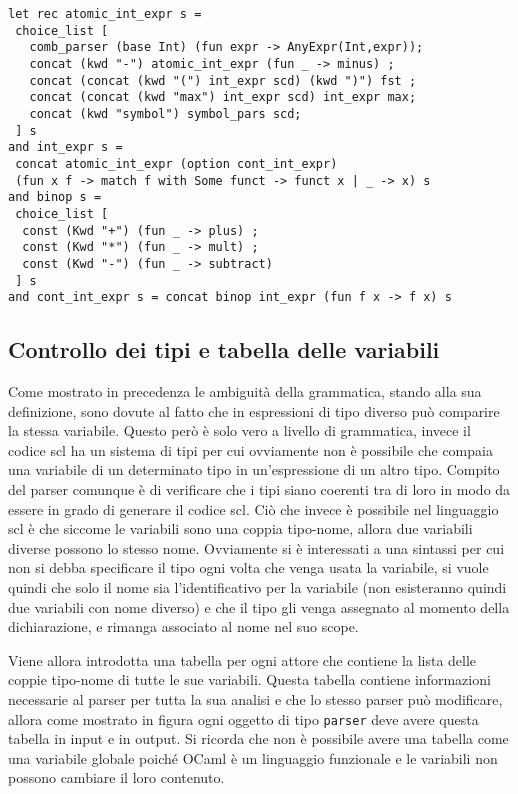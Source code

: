\documentclass[]{article}
\begin{document}
\begin{verbatim}
let rec atomic_int_expr s =
 choice_list [
   comb_parser (base Int) (fun expr -> AnyExpr(Int,expr));
   concat (kwd "-") atomic_int_expr (fun _ -> minus) ;
   concat (concat (kwd "(") int_expr scd) (kwd ")") fst ;
   concat (concat (kwd "max") int_expr scd) int_expr max;
   concat (kwd "symbol") symbol_pars scd;
 ] s
and int_expr s =
 concat atomic_int_expr (option cont_int_expr)
 (fun x f -> match f with Some funct -> funct x | _ -> x) s
and binop s =
 choice_list [
  const (Kwd "+") (fun _ -> plus) ;
  const (Kwd "*") (fun _ -> mult) ;
  const (Kwd "-") (fun _ -> subtract)
 ] s
and cont_int_expr s = concat binop int_expr (fun f x -> f x) s
\end{verbatim}

\hypertarget{controllo-dei-tipi-e-tabella-delle-variabili}{%
\subsection{Controllo dei tipi e tabella delle
variabili}\label{controllo-dei-tipi-e-tabella-delle-variabili}}

Come mostrato in precedenza le ambiguità della grammatica, stando alla
sua definizione, sono dovute al fatto che in espressioni di tipo diverso
può comparire la stessa variabile. Questo però è solo vero a livello di
grammatica, invece il codice scl ha un sistema di tipi per cui
ovviamente non è possibile che compaia una variabile di un determinato
tipo in un'espressione di un altro tipo. Compito del parser comunque è
di verificare che i tipi siano coerenti tra di loro in modo da essere in
grado di generare il codice scl. Ciò che invece è possibile nel
linguaggio scl è che siccome le variabili sono una coppia tipo-nome,
allora due variabili diverse possono lo stesso nome. Ovviamente si è
interessati a una sintassi per cui non si debba specificare il tipo ogni
volta che venga usata la variabile, si vuole quindi che solo il nome sia
l'identificativo per la variabile (non esisteranno quindi due variabili
con nome diverso) e che il tipo gli venga assegnato al momento della
dichiarazione, e rimanga associato al nome nel suo scope.

Viene allora introdotta una tabella per ogni attore che contiene la
lista delle coppie tipo-nome di tutte le sue variabili. Questa tabella
contiene informazioni necessarie al parser per tutta la sua analisi e
che lo stesso parser può modificare, allora come mostrato in figura ogni
oggetto di tipo \texttt{parser} deve avere questa tabella in input e in
output. Si ricorda che non è possibile avere una tabella come una
variabile globale poiché OCaml è un linguaggio funzionale e le variabili
non possono cambiare il loro contenuto.
\end{document}
